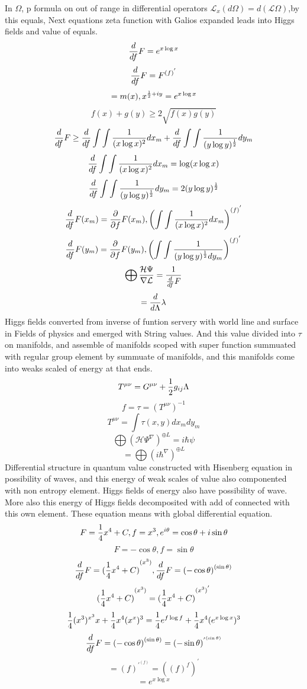 \documentclass{jsarticle}
\begin{document}
       In $ \Omega $, p formula on out of range in differential operators
  $ \mathcal{L}_x (d \Omega) = d(\mathcal{L} \Omega) $,by this equals, 
  Next equations zeta function with Galios expanded
  leads into Higgs fields and value of equals.
  $$ {d \over df}F = e^{x \log x} $$
  $$ {d \over df}F = F^{{(f)}^{'}} $$
  $$ = m(x), x^{{1 \over 2} + iy} = e^{x \log x} $$
  $$ f(x) + g(y) \ge 2 \sqrt{f(x) g(y)} $$ 
  $$ {d \over df}F \ge {d \over df}\int \int{1 \over (x \log x)^2}dx_m 
  + {d \over df}\int \int{1 \over (y \log y)^{1 \over 2}}dy_m $$
  $$ {d \over df}  \int \int{1 \over (x \log x)^2}dx_m = \log (x \log x) $$
  $$ {d \over df}\int \int{1 \over (y \log y)^{1 \over 2}}dy_m = 
  2(y \log y)^{1 \over 2} $$
  $$  {d \over df} F(x_m) = {\partial \over \partial f}F(x_m),
  \left({\int \int{1 \over (x \log x)^2}dx_m}\right)^{(f)^{'}} $$ 
  $$ {d \over df} F(y_m) = {\partial \over \partial f}F(y_m),
  \left({\int \int{1 \over (y \log y)^{1 \over 2}dy_m}}\right)^{(f)^{'}} $$
  $$ \bigoplus {\mathcal{H}\Psi \over \nabla \mathcal{L}} 
     = {1 \over {{d \over d f}F}}  $$
  $$ = {d \over d \Lambda}\lambda $$
  Higgs fields converted from inverse of funtion servery with world line and
  surface in Fields of physics and emerged with String values.
  And this value divided into $\tau$ on manifolds, and assemble
  of manifolds scoped with super function summuated with regular group element
  by summuate of manifolds, and this manifolds come into weaks scaled of 
  energy at that ends.
  $$ T^{\mu\nu} =  {G^{\mu\nu} + {1 \over 2}g_{ij}\Lambda} $$
  $$ f = \tau = \left(T^{\mu\nu}\right)^{-1} $$
  $$ T^{\mu\nu} = \int \tau(x,y) dx_m dy_m $$
  $$ \bigoplus \left({\mathcal{H}\Psi}^{\nabla} \right)^{\oplus L} = 
  i \hbar \psi $$
  $$ = \bigoplus {{\left({i \hbar}^{\nabla} \right)}^{\oplus L}} $$
  Differential structure in quantum value constructed with Hisenberg equation
  in possibility of waves, and this energy of weak scales of value 
  also componented with non entropy element. Higgs fields of energy also
  have possibility of wave.
  More also this energy of Higgs fields decomposited with add of connected
  with this own element.
  These equation means with global differential equation.
  $$ F = {1 \over 4}x^4 + C, f = x^3, e^{i \theta} = \cos \theta +
  i \sin \theta $$
  $$ F = - \cos \theta, f = \sin \theta $$
  $$ {d \over df}F = {({1 \over 4}x^4 + C)}^{(x^3)}, 
  {d \over df}F = {(-\cos \theta)}^{(\sin \theta)} $$
  $$ {({1 \over 4}x^4 + C)}^{(x^3)} = {({1 \over 4}x^4 + C)}^{(x^3)^{'}} $$
  $$ {1 \over 4}(x^3)^{x^3} x + {1 \over 4}x^4 (x^x)^3 
  = {1 \over 4}e^{f \log f} + {1 \over 4}x^4 (e^{x \log x})^3 $$
  $$ {d \over df}F = {(-\cos \theta)}^{(\sin \theta)} = 	
   (- \sin \theta)^{{'}^{(\sin \theta)}} $$
  $$ = (f)^{{'}^{(f)}} = {((f)^f)}^{'} $$
  $$ = e^{x \log x} $$
\end{document}
